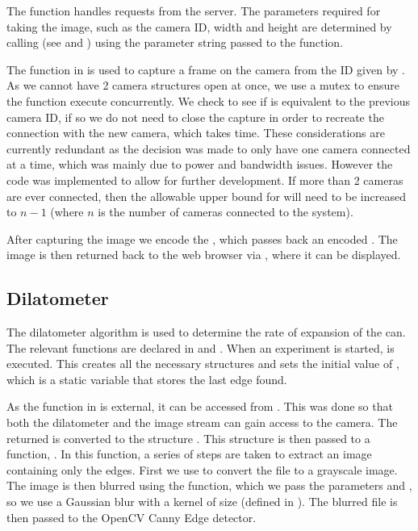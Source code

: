  The  function handles requests from the server.  The parameters required for taking the image, such as the camera ID, width and height are determined by calling  (see  and ) using the parameter string passed to the function.

The function  in  is used to capture a frame on the camera from the ID given by .  As we cannot have 2 camera structures open at once, we use a mutex to ensure the function execute concurrently. We check to see if  is equivalent to the previous camera ID, if so we do not need to close the capture in order to recreate the connection with the new camera, which takes time.  These considerations are currently redundant as the decision was made to only have one camera connected at a time, which was mainly due to power and bandwidth issues.  However the code was implemented to allow for further development.  If more than 2 cameras are ever connected, then the allowable upper bound for  will need to be increased to $n-1$ (where $n$ is the number of cameras connected to the system).  

After capturing the image we encode the , which passes back an encoded . The image is then returned back to the web browser via , where it can be displayed.  

\subsection{Dilatometer}

The dilatometer algorithm is used to determine the rate of expansion of the can. The relevant functions are declared in  and . When an experiment is started,  is  executed.  This creates all the necessary structures and sets the initial value of , which is a static variable that stores the last edge found.

As the  function in  is external, it can be accessed from .  This was done so that both the dilatometer and the image stream can gain access to the camera.  The  returned is converted to the  structure .  This  structure is then passed to a function, .  In this function, a series of steps are taken to extract an image containing only the edges.  First we use  to convert the  file to a grayscale image.  The image is then blurred using the  function, which we pass the parameters  and , so  we use a Gaussian blur with a kernel of size  (defined in ).  The blurred file is then passed to the OpenCV Canny Edge detector.  

